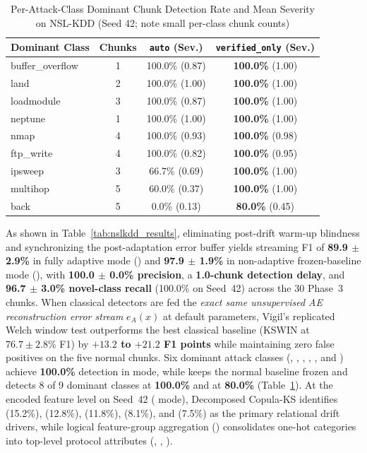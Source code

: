 \documentclass[10pt,conference]{IEEEtran}
\begin{document}
\begin{table}[!htbp]
\caption{Per-Attack-Class Dominant Chunk Detection Rate and Mean Severity on NSL-KDD (Seed 42; note small per-class chunk counts)}
\label{tab:perclass}
\centering
\scriptsize
\setlength{\tabcolsep}{3.5pt}
\begin{tabular}{lccc}
\toprule
\textbf{Dominant Class} & \textbf{Chunks} & \textbf{\texttt{auto} (Sev.)} & \textbf{\texttt{verified\_only} (Sev.)} \\
\midrule
buffer\_overflow & 1 & 100.0\% (0.87) & \textbf{100.0\%} (1.00) \\
land             & 2 & 100.0\% (1.00) & \textbf{100.0\%} (1.00) \\
loadmodule       & 3 & 100.0\% (0.87) & \textbf{100.0\%} (1.00) \\
neptune          & 1 & 100.0\% (1.00) & \textbf{100.0\%} (1.00) \\
nmap             & 4 & 100.0\% (0.93) & \textbf{100.0\%} (0.98) \\
ftp\_write       & 4 & 100.0\% (0.82) & \textbf{100.0\%} (0.95) \\
ipsweep          & 3 &  66.7\% (0.69) & \textbf{100.0\%} (1.00) \\
multihop         & 5 &  60.0\% (0.37) & \textbf{100.0\%} (1.00) \\
back             & 5 &   0.0\% (0.13) &  \textbf{80.0\%} (0.45) \\
\bottomrule
\end{tabular}
\end{table}

As shown in Table~\ref{tab:nslkdd_results}, eliminating post-drift warm-up
blindness and synchronizing the post-adaptation error buffer yields streaming
F1 of \textbf{89.9 $\pm$ 2.9\%} in
fully adaptive mode () and \textbf{97.9 $\pm$ 1.9\%} in non-adaptive
frozen-baseline mode (), with \textbf{100.0 $\pm$ 0.0\%
precision}, a \textbf{1.0-chunk detection delay}, and \textbf{96.7 $\pm$ 3.0\%
novel-class recall} (100.0\% on Seed~42) across the 30 Phase~3 chunks.
When classical detectors are fed the \emph{exact same
unsupervised AE reconstruction error stream} $e_A(x)$ at default parameters,
Vigil's replicated Welch window test outperforms the best classical baseline
(KSWIN at $76.7 \pm 2.8\%$ F1) by \textbf{$+13.2$ to $+21.2$ F1 points} while
maintaining zero false positives on the five normal chunks. Six dominant attack
classes (, , , ,
, and ) achieve \textbf{100.0\%} detection in
 mode, while  keeps the normal baseline frozen and
detects 8 of 9 dominant classes at \textbf{100.0\%} and  at
\textbf{80.0\%} (Table~\ref{tab:perclass}).
At the encoded feature level on Seed~42 ( mode), Decomposed Copula-KS
identifies  (15.2\%),  (12.8\%),
 (11.8\%),  (8.1\%), and
 (7.5\%) as the primary relational drift drivers, while
logical feature-group aggregation () consolidates one-hot
categories into top-level protocol attributes (, ,
).
\end{document}
